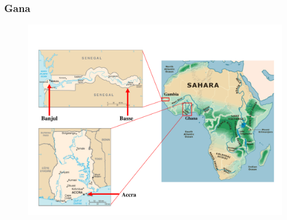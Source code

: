 \begin{frame}
  \frametitle{Gana}
  \begin{figure}[H]
    \centering
    \includegraphics[scale=0.3]{../../../inputs/images/zheng/africa_ghana.pdf}
  \end{figure}
\end{frame}

